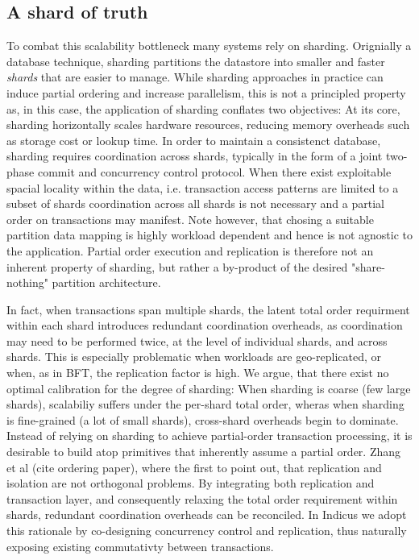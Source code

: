 \subsection{A shard of truth}
To combat this scalability bottleneck many systems rely on sharding. Orignially a database technique, sharding partitions the datastore into smaller and faster \textit{shards} that are easier to manage. While sharding approaches in practice  can induce partial ordering and increase parallelism, this is not a principled property as, in this case, the application of sharding conflates two objectives:
At its core, sharding horizontally scales hardware resources, reducing memory overheads such as storage cost or lookup time. In order to maintain a consistenct database, sharding requires coordination across shards, typically in the form of a joint two-phase commit and concurrency control protocol. 
When there exist exploitable spacial locality within the data, i.e. transaction access patterns are limited to a subset of shards coordination across all shards is not necessary and a partial order on transactions may manifest. Note however, that chosing a suitable partition data mapping is highly workload dependent and hence  is not agnostic to the application.
Partial order execution and replication is therefore not an inherent property of sharding, but rather a by-product of the desired "share-nothing" partition architecture. 

In fact, when transactions span multiple shards, the latent total order requirment within each shard introduces redundant coordination overheads, as coordination may need to be performed twice, at the level of individual shards, and across shards. This is especially problematic when workloads are geo-replicated, or when, as in BFT, the replication factor is high. 
We argue, that there exist no optimal calibration for the degree of sharding: When sharding is coarse (few large shards), scalabiliy suffers under the per-shard total order, wheras when sharding is fine-grained (a lot of small shards), cross-shard overheads begin to dominate. 
Instead of relying on sharding to achieve partial-order transaction processing, it is desirable to build atop primitives that inherently assume a partial order.
Zhang et al (cite ordering paper), where the first to point out, that replication and isolation are not orthogonal problems. By integrating both replication and transaction layer, and consequently relaxing the total order requirement within shards, redundant coordination overheads can be reconciled.
In Indicus we adopt this rationale by co-designing concurrency control and replication, thus naturally exposing existing commutativty between transactions.



